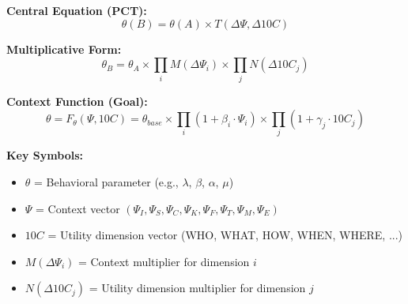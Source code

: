 
\begin{abstract}
This appendix formalizes the central theoretical contribution of EBF:
behavioral parameters are context-dependent functions, not universal constants.
We introduce the Parameter Context Transformation (PCT) framework with the
central equation $\theta_B = \theta_A \times \prod_i M(\Delta\Psi_i) \times \prod_j N(\Delta 10C_j)$,
enabling systematic parameter transfer across contexts. The framework treats
cross-study variation as signal (information about context-dependence) rather
than noise (estimation error). We provide axioms, worked examples, and an
iterative learning paradigm where each new paper improves all future predictions.
\end{abstract}


\begin{tcolorbox}[colback=blue!5!white, colframe=blue!75!black, title=Quick Reference: Parameter Context Transformation]
\textbf{Central Equation (PCT):}
\[
\theta(B) = \theta(A) \times T(\Delta\Psi, \Delta 10C)
\]

\textbf{Multiplicative Form:}
\[
\theta_B = \theta_A \times \prod_i M(\Delta\Psi_i) \times \prod_j N(\Delta 10C_j)
\]

\textbf{Context Function (Goal):}
\[
\theta = F_\theta(\Psi, 10C) = \theta_{base} \times \prod_i (1 + \beta_i \cdot \Psi_i) \times \prod_j (1 + \gamma_j \cdot 10C_j)
\]

\textbf{Key Symbols:}
\begin{itemize}
    \item $\theta$ = Behavioral parameter (e.g., $\lambda$, $\beta$, $\alpha$, $\mu$)
    \item $\Psi$ = Context vector $(\Psi_I, \Psi_S, \Psi_C, \Psi_K, \Psi_F, \Psi_T, \Psi_M, \Psi_E)$
    \item $10C$ = Utility dimension vector (WHO, WHAT, HOW, WHEN, WHERE, ...)
    \item $M(\Delta\Psi_i)$ = Context multiplier for dimension $i$
    \item $N(\Delta 10C_j)$ = Utility dimension multiplier for dimension $j$
\end{itemize}
\end{tcolorbox}

